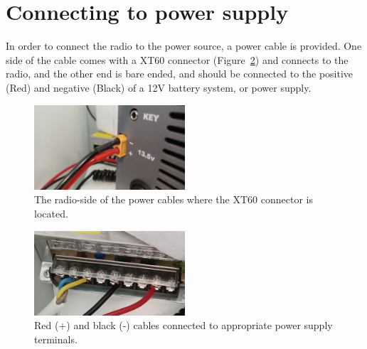 \documentclass[11pt,a4paper]{article}
\begin{document}
\section{Connecting to power supply}

In order to connect the radio to the power source, a power cable is provided. One side of the
cable comes with a XT60 connector (Figure~\ref{fig:psu2}) and connects to the radio, and the other end is bare ended,
and should be connected to the positive (Red) and negative (Black) of a 12V battery system, or power
supply.

\begin{figure}[!ht]
  \centering
  \includegraphics[width=0.5\textwidth]{pictures/psu1.jpeg}
  \caption{The radio-side of the power cables where the XT60 connector is located.}
  \label{fig:psu1}
\end{figure}

\begin{figure}[!ht]
  \centering
  \includegraphics[width=0.5\textwidth]{pictures/psu2.jpeg}
  \caption{Red (+) and black (-) cables connected to appropriate power supply terminals.}
  \label{fig:psu2}
\end{figure}
\end{document}
